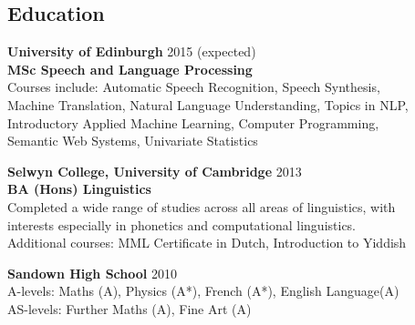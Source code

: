 \documentclass[margin, line, 12pt]{res}
\begin{document}
 
 
\address{dan.wells@cantab.net $\diamond$ 07858 506 987}


 
\begin{resume}


\section{Education}
{\bf University of Edinburgh}  \hfill 2015 (expected) \\ 
 {\bf MSc Speech and Language Processing} \\ 
{\small Courses include: Automatic Speech Recognition, Speech Synthesis, \\ Machine Translation, Natural Language Understanding,  Topics in NLP, \\ Introductory Applied Machine Learning, Computer Programming, \\ Semantic Web Systems, Univariate Statistics}

{\bf Selwyn College, University of Cambridge} \hfill 2013 \\ 
{\bf BA (Hons) Linguistics} \\
{\small Completed a wide range of studies across all areas of linguistics, with \\ interests especially in phonetics and computational linguistics. \smallskip \\
Additional courses: MML Certificate in Dutch, Introduction to Yiddish} 

{\bf Sandown High School} \hfill 2010 \\
{\small A-levels: Maths (A), Physics (A*), French (A*), English Language(A)\\
AS-levels: Further Maths (A), Fine Art (A)}
 

\end{resume}
\end{document}
